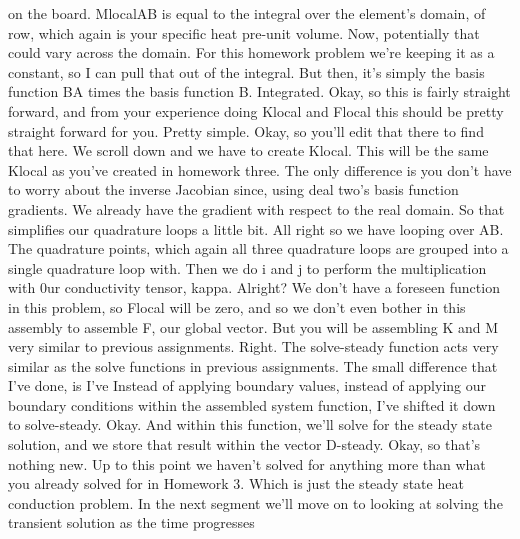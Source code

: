 \documentclass[10pt]{article}
\begin{document}
on the board. MlocalAB is equal to the integral over the element's domain, of row, which again is your specific heat pre-unit volume. Now, potentially that could vary across the domain. For this homework problem we're keeping it as a constant, so I can pull that out of the integral. But then, it's simply the basis function BA times the basis function B. Integrated. Okay, so this is fairly straight forward, and from your experience doing Klocal and Flocal this should be pretty straight forward for you. Pretty simple. Okay, so you'll edit that there to find that here. We scroll down and we have to create Klocal. This will be the same Klocal as you've created in homework three. The only difference is you don't have to worry about the inverse Jacobian since, using deal two's basis function gradients. We already have the gradient with respect to the real domain. So that simplifies our quadrature loops a little bit. All right so we have looping over AB. The quadrature points, which again all three quadrature loops are grouped into a single quadrature loop with. Then we do i and j to perform the multiplication with 0ur conductivity tensor, kappa. Alright? We don't have a foreseen function in this problem, so Flocal will be zero, and so we don't even bother in this assembly to assemble F, our global vector. But you will be assembling K and M very similar to previous assignments. Right. The solve-steady function acts very similar as the solve functions in previous assignments. The small difference that I've done, is I've Instead of applying boundary values, instead of applying our boundary conditions within the assembled system function, I've shifted it down to solve-steady. Okay. And within this function, we'll solve for the steady state solution, and we store that result within the vector D-steady. Okay, so that's nothing new. Up to this point we haven't solved for anything more than what you already solved for in Homework 3. Which is just the steady state heat conduction problem. In the next segment we'll move on to looking at solving the transient solution as the time progresses
\end{document}
